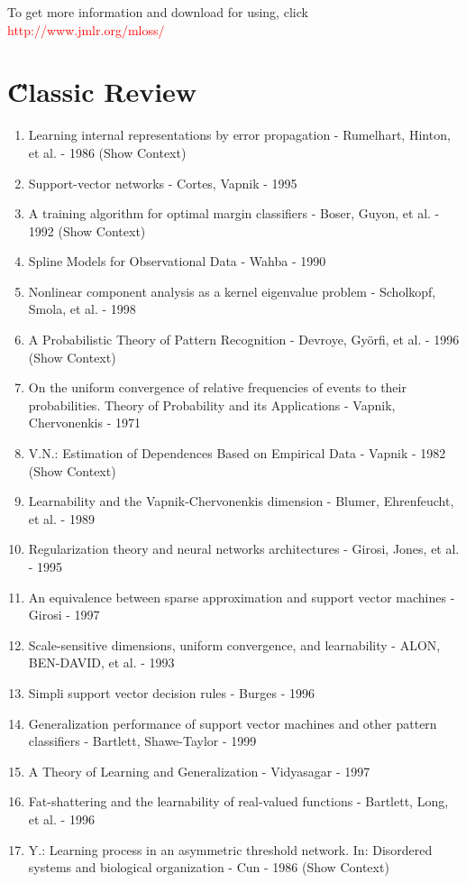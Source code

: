 \documentclass[a4paper,12pt,oneside]{book}
\newcommand{\red}[1]{  \textcolor{red}  {#1}}   %
\begin{document}
To get more information and download for using, click \red{http://www.jmlr.org/mloss/}



\section{\H Classic Review}
\begin{enumerate}
\item Learning internal representations by error propagation - Rumelhart, Hinton, et al. - 1986 (Show Context)
\item Support-vector networks - Cortes, Vapnik - 1995
\item A training algorithm for optimal margin classifiers - Boser, Guyon, et al. - 1992 (Show Context)
\item Spline Models for Observational Data - Wahba - 1990
\item Nonlinear component analysis as a kernel eigenvalue problem - Scholkopf, Smola, et al. - 1998
\item A Probabilistic Theory of Pattern Recognition - Devroye, Györfi, et al. - 1996 (Show Context)
\item On the uniform convergence of relative frequencies of events to their probabilities. Theory of Probability and its Applications - Vapnik, Chervonenkis - 1971
\item V.N.: Estimation of Dependences Based on Empirical Data - Vapnik - 1982 (Show Context)
\item Learnability and the Vapnik-Chervonenkis dimension - Blumer, Ehrenfeucht, et al. - 1989
\item Regularization theory and neural networks architectures - Girosi, Jones, et al. - 1995
\item An equivalence between sparse approximation and support vector machines - Girosi - 1997
\item Scale-sensitive dimensions, uniform convergence, and learnability - ALON, BEN-DAVID, et al. - 1993
\item Simpli support vector decision rules - Burges - 1996
\item Generalization performance of support vector machines and other pattern classifiers - Bartlett, Shawe-Taylor - 1999
\item A Theory of Learning and Generalization - Vidyasagar - 1997
\item Fat-shattering and the learnability of real-valued functions - Bartlett, Long, et al. - 1996
\item Y.: Learning process in an asymmetric threshold network. In: Disordered systems and biological organization - Cun - 1986 (Show Context)

\end{enumerate}
\end{document}
